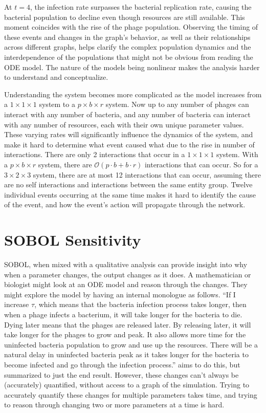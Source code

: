 At $t=4$, the infection rate surpasses the bacterial replication rate, causing the bacterial population to decline even though resources are still available. 
This moment coincides with the rise of the phage population. 
Observing the timing of these events and changes in the graph's behavior, as well as their relationships across different graphs, helps clarify the complex population dynamics and the interdependence of the populations that might not be obvious from reading the ODE model. 
The nature of the models being nonlinear makes the analysis harder to understand and conceptualize. 

Understanding the system becomes more complicated as the model increases from a $1\times1\times1$ system to a $p\times b\times r$ system. 
Now up to any number of phages can interact with any number of bacteria, and any number of bacteria can interact with any number of resources, each with their own unique parameter values. 
These varying rates will significantly influence the dynamics of the system, and make it hard to determine what event caused what due to the rise in number of interactions.
There are only 2 interactions that occur in a $1\times1\times1$ system. 
With a $p\times b\times r$ system, there are $\mathcal{O}(p\cdot b + b\cdot r)$ interactions that can occur. 
So for a $3\times2\times3$ system, there are at most 12 interactions that can occur, assuming there are no self interactions and interactions between the same entity group. 
Twelve individual events occurring at the same time makes it hard to identify the cause of the event, and how the event's action will propagate through the network. 

\section{SOBOL Sensitivity}
SOBOL, when mixed with a qualitative analysis can provide insight into why when a parameter changes, the output changes as it does. 
A mathematician or biologist might look at an ODE model and reason through the changes. 
They might explore the model by having an internal monologue as follows. 
“If I increase $\tau$, which means that the bacteria infection process takes longer, then when a phage infects a bacterium, it will take longer for the bacteria to die. 
Dying later means that the phages are released later. 
By releasing later, it will take longer for the phages to grow and peak. 
It also allows more time for the uninfected bacteria population to grow and use up the resources. 
There will be a natural delay in uninfected bacteria peak as it takes longer for the bacteria to become infected and go through the infection process.”
 aims to do this, but summarized to just the end result. 
However, these changes can't always be (accurately) quantified, without access to a graph of the simulation. 
Trying to accurately quantify these changes for multiple parameters takes time, and trying to reason through changing two or more parameters at a time is hard. 

